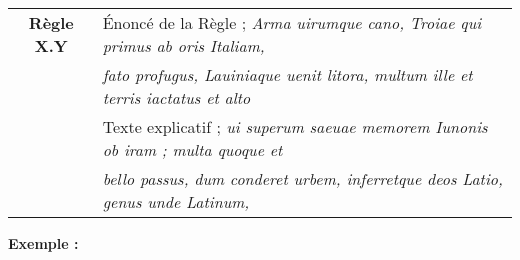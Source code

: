 \medskip

\begin{center}
\begin{tabular}{|c l|}
\hline
\rowcolor{red!10}\textbf{Règle X.Y} & Énoncé de la Règle ; \textit{Arma uirumque cano, Troiae qui primus ab oris Italiam,} \\
\rowcolor{red!10} & \textit{fato profugus, Lauiniaque uenit litora, multum ille et terris iactatus et alto} \\ \hline
 & Texte explicatif ; \textit{ui superum saeuae memorem Iunonis ob iram ; multa quoque et} \\
 & \textit{bello passus, dum conderet urbem, inferretque deos Latio, genus unde Latinum,} \\ \hline
\hline
\end{tabular}
\end{center}

\medskip

\begin{large}
\textbf{Exemple :}
\end{large}
\medskip


\bigskip

\pagebreak